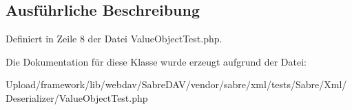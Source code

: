 \subsection{Ausführliche Beschreibung}


Definiert in Zeile 8 der Datei Value\+Object\+Test.\+php.



Die Dokumentation für diese Klasse wurde erzeugt aufgrund der Datei\+:\begin{DoxyCompactItemize}
\item 
Upload/framework/lib/webdav/\+Sabre\+D\+A\+V/vendor/sabre/xml/tests/\+Sabre/\+Xml/\+Deserializer/Value\+Object\+Test.\+php\end{DoxyCompactItemize}
